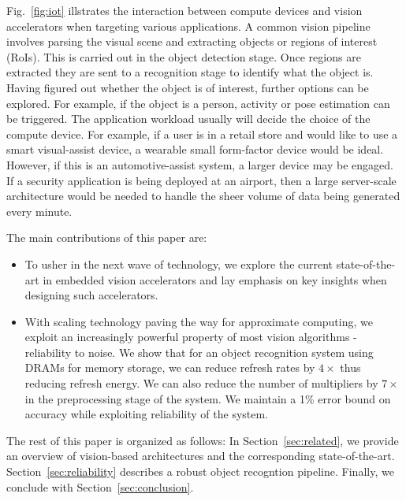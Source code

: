 Fig.~\ref{fig:iot} illstrates the interaction between compute devices and vision accelerators when targeting various applications. A common vision pipeline involves parsing the visual scene and extracting objects or regions of interest (RoIs). This is 
carried out in the object detection stage. Once regions are extracted they are sent to a recognition stage to identify 
what the object is. Having figured out whether the object is of interest, further options can be explored. For example, if the 
object is a person, activity or pose estimation can be triggered. The application workload usually will decide the choice of 
the compute device. For example, if a user is in a retail store and would like to use a smart visual-assist device, a 
wearable small form-factor device would be ideal. However, if this is an automotive-assist system, a larger device may be 
engaged. If a security application is being deployed at an airport, then a large server-scale architecture would be needed to
handle the sheer volume of data being generated every minute.

The main contributions of this paper are:
\begin{itemize}
\item To usher in the next wave of technology, we explore the current state-of-the-art in 
embedded vision accelerators and lay emphasis on key insights when designing such accelerators.
\item With scaling technology paving the way for approximate computing, we exploit an increasingly powerful property of most vision algorithms - reliability to noise. 
We show that for an object recognition system using DRAMs for memory storage, we can reduce refresh rates by $4\times$ thus reducing refresh energy. We can also reduce the number of multipliers by $7\times$ in the preprocessing stage of the system. We maintain a 1\% error bound on accuracy while exploiting reliability of the system.
\end{itemize}

The rest of this paper is organized as follows:
In Section~\ref{sec:related}, we provide an overview of vision-based architectures and the corresponding state-of-the-art.
Section~\ref{sec:reliability} describes a robust object recogntion pipeline.
Finally, we conclude with Section~\ref{sec:conclusion}.
